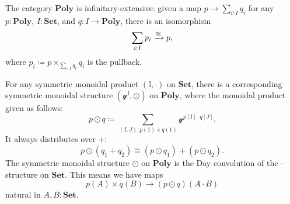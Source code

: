 \documentclass[11pt, one side, article]{memoir}
\theoremstyle{definition}
\theoremstyle{plain}
\newcommand{\Cat}[1]{\mathbf{#1}}%
\newcommand{\To}[2][]{\xrightarrow[#1]{\tn{$#2$}}}
\newcommand{\tn}[1]{\textnormal{#1}}
\newcommand{\smset}{\Cat{Set}}
\newcommand{\yon}{{\mathcal{y}}}
\newcommand{\poly}{\Cat{Poly}}
\newcommand{\0}{\textsf{0}}
\newcommand{\1}{\tn{\textsf{1}}}
\begin{document}
The category $\poly$ is infinitary-extensive: given a map $p\to\sum_{i:I}q_i$ for any $p:\poly$, $I:\smset$, and $q\colon I\to\poly$, there is an isomorphism
\begin{equation}
	\sum_{i:I}p_i\To{\cong}p,
\end{equation} 
where $p_i\coloneqq p\times_{\sum_{i:I}q_i}q_i$ is the pullback.


For any symmetric monoidal product $(\mathbb{I},\cdot)$ on $\smset$, there is a corresponding symmetric monoidal structure $(\yon^\mathbb{I},\odot)$ on $\poly$, where the monoidal product given as follows:
\begin{equation}\label{eqn.day_all}
p\odot q\coloneqq\sum_{(I,J): p(1)\times q(1)}\yon^{p[I]\cdot q[J]}.
\end{equation}
It always distributes over $+$:
\begin{equation}\label{eqn.day_distributes}
p\odot(q_1+q_2)\cong (p\odot q_1)+(p\odot q_2).
\end{equation}
The symmetric monoidal structure $\odot$ on $\poly$ is the Day convolution of the $\cdot$ structure on $\smset$. This means we have maps
\begin{equation}\label{eqn.Day}
	p(A)\times q(B)\to (p\odot q)(A\cdot B)
\end{equation}
natural in $A,B:\smset$. 
\end{document}
